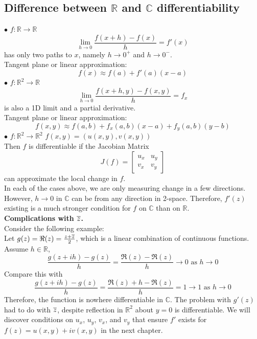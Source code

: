 \documentclass[11pt]{article}
\begin{document}
\subsection{Difference between $\mathbb{R}$ and $\mathbb{C}$ differentiability}
$\bullet$ $f: \mathbb{R} \to \mathbb{R}$ 
$$\lim_{h\to0}\frac{f(x+h) - f(x)}{h} = f'(x)$$ 
has only two paths to $x$, namely $h \to 0^+$ and $h \to 0^-$. \\ 
Tangent plane or linear approximation: 
$$f(x) \approx f(a) + f'(a)(x - a)$$
$\bullet$ $f: \mathbb{R}^2 \to \mathbb{R}$
$$\lim_{h\to0}\frac{f(x+h, y) - f(x, y)}{h} = f_x$$ 
is also a 1D limit and a partial derivative. \\
Tangent plane or linear approximation: 
$$f(x,y) \approx f(a,b) + f_x(a,b)(x - a) + f_y(a, b)(y - b)$$
$\bullet$ $f: \mathbb{R}^2 \to \mathbb{R}^2$ $f(x, y) = (u(x, y),v(x,y))$ \\
Then $f$ is differentiable if the Jacobian Matrix
\begin{equation*}
J(f) = 
\begin{bmatrix}
 u_x & u_y \\
 v_x & v_y
\end{bmatrix}
\end{equation*}
can approximate the local change in $f$. \\
In each of the cases above, we are only measuring change in a few directions. However, $h \to0$ in $\mathbb{C}$ can be from any direction in 2-space. Therefore, $f'(z)$ existing is a much stronger condition for $f$ on $\mathbb{C}$ than on $\mathbb{R}$. \\
\newline
\textbf{Complications with $\overline{z}$.}\\
Consider the following example: \\
Let $g(z) = \Re(z) = \frac{z + \overline{z}}{2}$, which is a linear combination of continuous functions. \\
Assume $h \in \mathbb{R}$, 
\begin{equation*}
\frac{g(z + ih) - g(z)}{h} = \frac{\Re(z) - \Re(z)}{h} \to 0 \mbox{ as } h \to 0 
\end{equation*}
Compare this with 
\begin{equation*} 
\frac{g(z + ih) - g(z)}{h} = \frac{\Re(z) + h -\Re(z)}{h} = 1 \to 1 \mbox{ as } h \to 0
\end{equation*}
Therefore, the function is nowhere differentiable in $\mathbb{C}$. The problem with $g'(z)$ had to do with $\overline{z}$, despite reflection in $\mathbb{R}^2$ about $y = 0$ is differentiable. We will discover conditions on $u_x$, $u_y$, $v_x$, and $v_y$ that ensure $f'$ exists for $f(z) = u(x, y) + iv(x, y)$ in the next chapter.  \\
\end{document}
